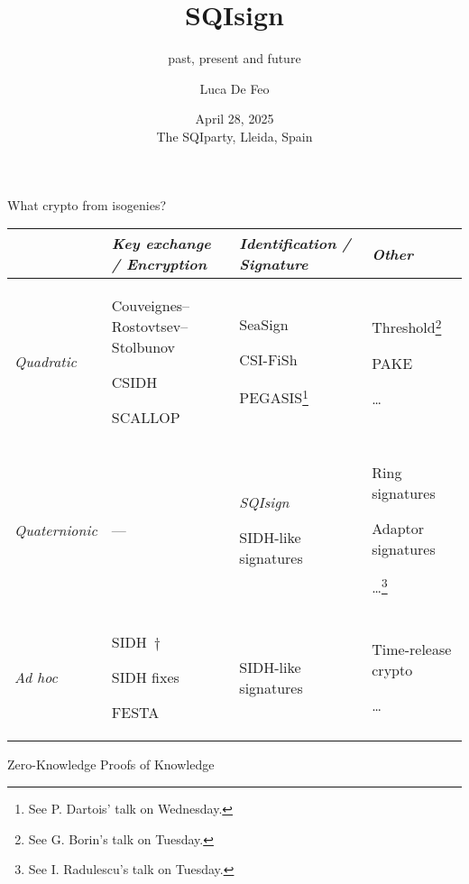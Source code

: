 \documentclass[aspectratio=169]{beamer}
\title{SQIsign}
\subtitle{past, present and future}
\author{Luca De Feo}
\date[April 28, 2025, The SQIparty]{April 28, 2025\\
  The SQIparty, Lleida, Spain}
\institute{IBM Research Zürich}
\begin{document}
\frame[plain]{\titlepage}


\begin{frame}{What crypto from isogenies?}
  \small
  \renewcommand{\arraystretch}{1.5}
  \begin{tabular}{l p{} p{} p{}}
    & \emph{Key exchange / Encryption} & \emph{Identification / Signature} & \emph{Other}\\
    \hline
    \emph{Quadratic}
    & Couveignes--Rostovtsev--Stolbunov\par CSIDH\par SCALLOP
                                & SeaSign\par CSI-FiSh\par PEGASIS\footnote{See P. Dartois' talk on Wednesday.}
                                                             & Threshold\footnote{See G. Borin's talk on Tuesday.}\par PAKE\par \dots\\
    \emph{Quaternionic}
    & ---
                                & \strut\emph{SQIsign}\par SIDH-like signatures
                                                             & Ring signatures\par Adaptor signatures\par \dots\footnote{See I. Radulescu's talk on Tuesday.}\\
    \emph{\textit{Ad hoc}}
    & \strut\alert{SIDH~$\dagger$}\par SIDH fixes\par FESTA
                                & SIDH-like signatures
                                                             & Time-release crypto\par\dots
  \end{tabular}
\end{frame}


\begin{frame}{Zero-Knowledge Proofs of Knowledge}
  \centering
\end{frame}
\end{document}
